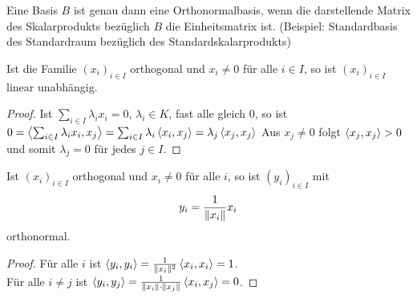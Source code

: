 \begin{remark}
	Eine Basis $B$ ist genau dann eine Orthonormalbasis, wenn die darstellende Matrix des Skalarprodukts bezüglich $B$ die Einheitsmatrix ist. (Beispiel: Standardbasis des Standardraum bezüglich des Standardskalarprodukts)
\end{remark}

\begin{lemma}
	Ist die Familie $(x_i)_{i\in I}$ orthogonal und $x_i\neq 0$ für alle $i\in I$, so ist $(x_i)_{i\in I}$ linear unabhängig.
\end{lemma}
\begin{proof}
	Ist $\sum_{i\in I} \lambda_i x_i=0$, $\lambda_i\in K$, fast alle gleich 0, so ist $0=\left\langle \sum_{i\in I} \lambda_i x_i,x_j\right\rangle=\sum_{i\in I} \lambda_i\left\langle x_i,x_j\right\rangle=\lambda_j\left\langle x_j,x_j\right\rangle$ Aus $x_j\neq 0$ folgt $\left\langle x_j,x_j\right\rangle>0$ und somit $\lambda_j=0$ für jedes $j\in I$.
\end{proof}

\begin{lemma}
	Ist $(x_i)_{i\in I}$ orthogonal und $x_i\neq 0$ für alle $i$, so ist $(y_i)_{i\in I}$ mit
	\begin{align}
		y_i=\frac{1}{\Vert x_i\Vert}x_i\notag
	\end{align}
	orthonormal.
\end{lemma}
\begin{proof}
	Für alle $i$ ist $\left\langle y_i,y_i\right\rangle=\frac{1}{\Vert x_i\Vert^2}\left\langle x_i,x_i\right\rangle=1$. \\
	Für alle $i\neq j$ ist $\left\langle y_i,y_j\right\rangle=\frac{1}{\Vert x_i\Vert\cdot \Vert x_j\Vert}\left\langle x_i,x_j\right\rangle=0$.
\end{proof}

